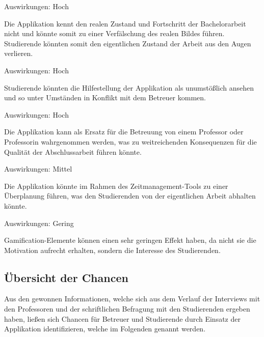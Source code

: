 \documentclass{scrreprt}
\begin{document}
\begin{enumerate} [label=\textit{[R\arabic*]}]
\item \label{risk:realerZustand} 
\par Auswirkungen: Hoch
\par Die Applikation kennt den realen Zustand und Fortschritt der Bachelorarbeit nicht und könnte somit zu einer Verfälschung des realen Bildes führen. Studierende könnten somit den eigentlichen Zustand der Arbeit aus den Augen verlieren.
\item \label{risk:inhaltUnumstoesslich} 
\par Auswirkungen: Hoch
\par Studierende könnten die Hilfestellung der Applikation als unumstößlich ansehen und so unter Umständen in Konflikt mit dem Betreuer kommen.
\item \label{risk:erstazBetreuer} 
\par Auswirkungen: Hoch
\par Die Applikation kann als Ersatz für die Betreuung von einem Professor oder Professorin wahrgenommen werden, was zu weitreichenden Konsequenzen für die Qualität der Abschlussarbeit führen könnte.
\item \label{risk:ueberplanung} 
\par Auswirkungen: Mittel
\par Die Applikation könnte im Rahmen des Zeitmanagement-Tools zu einer Überplanung führen, was den Studierenden von der eigentlichen Arbeit abhalten könnte.
\item \label{risk:gamificationEffekt} 
\par Auswirkungen: Gering
\par Gamification-Elemente können einen sehr geringen Effekt haben, da nicht sie die Motivation aufrecht erhalten, sondern die Interesse des Studierenden.
\end{enumerate}

\newpage
\subsection{Übersicht der Chancen} \label{sub:chancenuebersicht}
\par Aus den gewonnen Informationen, welche sich aus dem Verlauf der Interviews mit den Professoren und der schriftlichen Befragung mit den Studierenden ergeben haben, ließen sich Chancen für Betreuer und Studierende durch Einsatz der Applikation identifizieren, welche im Folgenden genannt werden.
\end{document}

